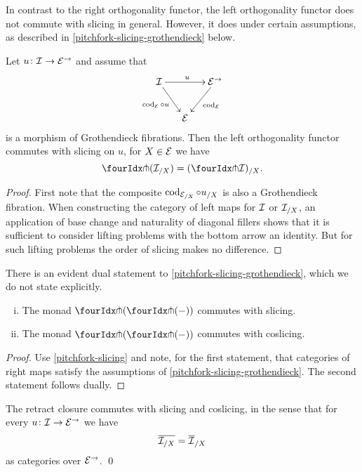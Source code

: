 \documentclass[reqno,10pt,a4paper,oneside,draft]{amsart}
\begin{document}
In contrast to the right orthogonality functor, the left orthogonality functor does not commute with slicing in general.
However, it does under certain assumptions, as described in \cref{pitchfork-slicing-grothendieck} below.

\begin{proposition} \label{pitchfork-slicing-grothendieck}
Let $u \co \cal{I} \to \cal{E}^\to$ and assume that
\[
\xymatrix@C-1em{
  \cal{I}
  \ar[rr]^{u}
  \ar[dr]_{\cod_{\cal{E}} \cc u}
&&
  \cal{E}^\to
  \ar[dl]^{\cod_{\cal{E}}}
\\&
  \cal{E}
}
\]
is a morphism of Grothendieck fibrations.
Then the left orthogonality functor commutes with slicing on $u$, \ie for $X \in \cal{E}$ we have
\[
  \liftl{(\cal{I}_{/X})} = (\liftl{\cal{I}})_{/X}
.\]
\end{proposition}

\begin{proof}
First note that the composite $\cod_{\cal{E}_{/X}} \cc u_{/X}$ is also a Grothendieck fibration.
When constructing the category of left maps for $\cal{I}$ or $\cal{I}_{/X}$, an application of base change and naturality of diagonal fillers shows that it is sufficient to consider lifting problems with the bottom arrow an identity.
But for such lifting problems the order of slicing makes no difference.
\end{proof}

There is an evident dual statement to \cref{pitchfork-slicing-grothendieck}, which we do not state explicitly.

\begin{corollary} \label{pitchfork-slicing-monad}
\leavevmode
\begin{enumerate}[(i)]
\item The monad $\liftl{(\liftr{(-)})}$ commutes with slicing.
\item The monad $\liftr{(\liftl{(-)})}$ commutes with coslicing.
\end{enumerate}
\end{corollary}

\begin{proof}
Use \cref{pitchfork-slicing} and note, for the first statement, that categories of right maps satisfy the assumptions of \cref{pitchfork-slicing-grothendieck}.
The second statement follows dually.
\end{proof}

\begin{proposition}
The retract closure commutes with slicing and coslicing, in the sense that for every $u \co \cal{I} \to \catE^\to$ we have
\[
  \overline{\cal{I}_{/X}} = \overline{\cal{I}}_{/X}
\]
as categories over $\catE^\to$.
\qed
\end{proposition}
\end{document}
